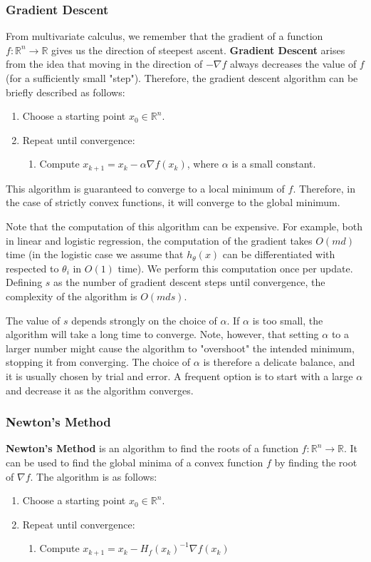 \documentclass{article}
\newcommand{\R}{\mathbb{R}}
\begin{document}
\subsubsection{Gradient Descent}

From multivariate calculus, we remember that the gradient of a function $f: \R^n \to \R$ gives us the direction of steepest ascent.
\textbf{Gradient Descent} arises from the idea that moving in the direction of $-\nabla f$ always decreases the value of $f$ (for a sufficiently small "step").
Therefore, the gradient descent algorithm can be briefly described as follows:
\begin{enumerate}
\item Choose a starting point $x_0 \in \R^n$.
\item Repeat until convergence:
\begin{enumerate}
\item Compute $x_{k+1} = x_k - \alpha \nabla f(x_k)$, where $\alpha$ is a small constant.
\end{enumerate}
\end{enumerate}
This algorithm is guaranteed to converge to a local minimum of $f$.
Therefore, in the case of strictly convex functions, it will converge to the global minimum.

Note that the computation of this algorithm can be expensive. 
For example, both in linear and logistic regression, the computation of the gradient takes $O(md)$ time (in the logistic case we assume that $h_\theta(x)$ can be differentiated with respected to $\theta_i$ in $O(1)$ time).
We perform this computation once per update.
Defining $s$ as the number of gradient descent steps until convergence, the complexity of the algorithm is $O(mds)$.

The value of $s$ depends strongly on the choice of $\alpha$.
If $\alpha$ is too small, the algorithm will take a long time to converge.
Note, however, that setting $\alpha$ to a larger number might cause the algorithm to "overshoot" the intended minimum, stopping it from converging.
The choice of $\alpha$ is therefore a delicate balance, and it is usually chosen by trial and error.
A frequent option is to start with a large $\alpha$ and decrease it as the algorithm converges.

\subsubsection{Newton's Method}

\textbf{Newton's Method} is an algorithm to find the roots of a function $f: \R^n \to \R$.
It can be used to find the global minima of a convex function $f$ by finding the root of $\nabla f$.
The algorithm is as follows:
\begin{enumerate}
\item Choose a starting point $x_0 \in \R^n$.
\item Repeat until convergence:
\begin{enumerate}
\item Compute $x_{k+1} = x_k - H_f(x_k)^{-1} \nabla f(x_k)$
\end{enumerate}
\end{enumerate}
\end{document}

